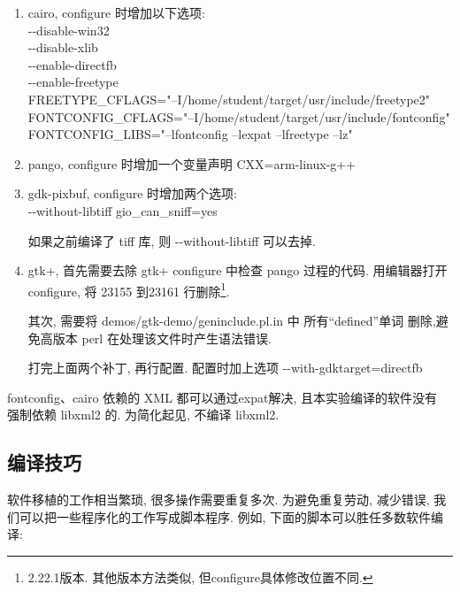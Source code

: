 \begin{enumerate}
  \item cairo,  configure 时增加以下选项:\\
      -{}-disable-win32 \\
      -{}-disable-xlib \\
      -{}-enable-directfb \\
      -{}-enable-freetype \\
      FREETYPE\_CFLAGS="--I/home/student/target/usr/include/freetype2" \\
      FONTCONFIG\_CFLAGS="--I/home/student/target/usr/include/fontconfig" \\
      FONTCONFIG\_LIBS="--lfontconfig --lexpat --lfreetype --lz"

  \item pango, configure 时增加一个变量声明 CXX=arm-linux-g++

  \item gdk-pixbuf, configure 时增加两个选项:\\
      -{}-without-libtiff gio\_can\_sniff=yes

      如果之前编译了 tiff 库, 则 -{}-without-libtiff 可以去掉.

  \item gtk+, 首先需要去除 gtk+ configure 中检查 pango 过程的代码.
      用编辑器打开 configure, 将 23155 到23161 行删除\footnote{2.22.1版本.
      其他版本方法类似, 但configure具体修改位置不同.}.

     其次, 需要将 demos/gtk-demo/geninclude.pl.in 中 所有``defined''单词
     删除,避免高版本 perl 在处理该文件时产生语法错误.

     打完上面两个补丁, 再行配置. 配置时加上选项 -{}-with-gdktarget=directfb
\end{enumerate}

    fontconfig、cairo 依赖的 XML 都可以通过expat解决, 且本实验编译的软件没有
强制依赖 libxml2 的. 为简化起见, 不编译 libxml2.

\subsection{编译技巧}
    软件移植的工作相当繁琐, 很多操作需要重复多次. 为避免重复劳动, 减少错误,
我们可以把一些程序化的工作写成脚本程序. 例如, 下面的脚本可以胜任多数软件编译:

\lstset{extendedchars=false}
\lstset{numbers=none} 
\lstset{frameround=fttt}
         
